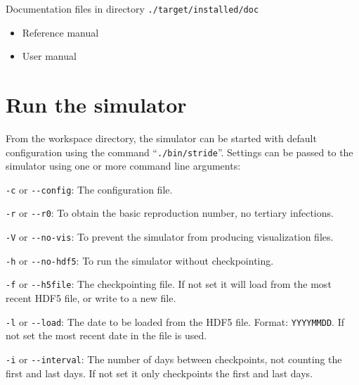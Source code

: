 \begin{compactitem}
\begin{itemize}
		
        \end{itemize}
    \item Documentation files
      	in directory \texttt{./target/installed/doc}
      	\begin{itemize}
        		\item Reference manual
        		\item User manual
        \end{itemize}
\end{compactitem}



\section{Run the simulator}


From the workspace directory, the simulator can be started with default configuration using the command \mbox{``\texttt{./bin/stride}''}. Settings can be passed to the simulator using one or more command line arguments:

\begin{compactitem}

\item \texttt{-c} or \texttt{{-}-config}: The configuration file.

\item \texttt{-r} or \texttt{{-}-r0}: To obtain the basic reproduction number, no tertiary infections.

\item \texttt{-V} or \texttt{{-}-no-vis}: To prevent the simulator from producing visualization files.

\item \texttt{-h} or \texttt{{-}-no-hdf5}: To run the simulator without checkpointing.

\item \texttt{-f} or \texttt{{-}-h5file}: The checkpointing file. If not set it will load from the most recent HDF5 file, or write to a new file.

\item \texttt{-l} or \texttt{{-}-load}: The date to be loaded from the HDF5 file. Format: \texttt{YYYYMMDD}. If not set the most recent date in the file is used.

\item \texttt{-i} or \texttt{{-}-interval}: The number of days between checkpoints, not counting the first and last days. If not set it only checkpoints the first and last days.

\end{compactitem}


